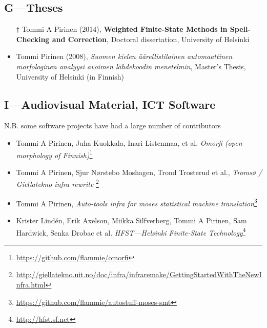 \documentclass[a4paper]{article}
\begin{document}
\subsection*{G---Theses}

\begin{itemize}
\item[$\dagger$] Tommi A Pirinen (2014), \textbf{Weighted Finite-State Methods in Spell-Checking and Correction}, Doctoral dissertation, University of Helsinki
\item Tommi Pirinen (2008), \textit{Suomen kielen äärellistilainen automaattinen morfologinen analyysi avoimen lähdekoodin menetelmin}, Master's Thesis, University of Helsinki (in Finnish)
\end{itemize}

\subsection*{I---Audiovisual Material, ICT Software}

N.B. some software projects have had a large number of contributors

\begin{itemize}
\item Tommi A Pirinen, Juha Kuokkala, Inari Listenmaa, et al.\textit{ Omorfi (open morphology of Finnish)}\footnote{\url{https://github.com/flammie/omorfi}}
\item Tommi A Pirinen, Sjur Nørstebo Moshagen, Trond Trosterud et al., \textit{Tromsø / Giellatekno infra rewrite} \footnote{\url{http://giellatekno.uit.no/doc/infra/infraremake/GettingStartedWithTheNewInfra.html}}
\item Tommi A Pirinen, \textit{Auto-tools infra for moses statistical machine translation}\footnote{\url{https://github.com/flammie/autostuff-moses-smt}}
\item Krister Lindén, Erik Axelson, Miikka Silfverberg, Tommi A Pirinen, Sam Hardwick, Senka Drobac et al. \textit{HFST---Helsinki Finite-State Technology}\footnote{\url{http://hfst.sf.net}}
\end{itemize}
\end{document}
